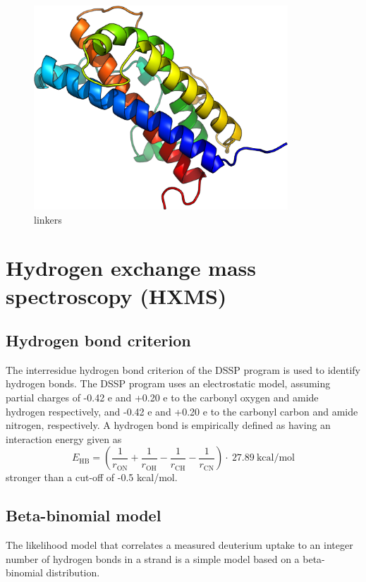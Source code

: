\begin{figure}
    \centering
    \includegraphics[width=0.85\textwidth]{figures/hGH_rainbow.pdf}
    \caption{linkers}
    \label{fig:hGH_homology}
\end{figure}

\section{Hydrogen exchange mass spectroscopy (HXMS)}

\subsection{Hydrogen bond criterion}

The interresidue hydrogen bond criterion of the DSSP program\cite{dssp} is used to identify hydrogen bonds.
The DSSP program uses an electrostatic model, assuming partial charges of -0.42 e and +0.20 e to the carbonyl oxygen and amide hydrogen respectively, and -0.42 e and +0.20 e to the carbonyl carbon and amide nitrogen, respectively.
A hydrogen bond is empirically defined as having an interaction energy given as
\begin{equation}
E_\mathrm{HB} = \left(\frac{1}{r_\mathrm{ON}} + \frac{1}{r_\mathrm{OH}} - \frac{1}{r_\mathrm{CH}} - \frac{1}{r_\mathrm{CN}} \right)\cdot\ 27.89\ \mathrm{kcal/mol}
\end{equation}
stronger than a cut-off of -0.5 kcal/mol.

\subsection{Beta-binomial model}
The likelihood model that correlates a measured deuterium uptake to an integer number of hydrogen bonds in a strand is a simple model based on a beta-binomial distribution.

